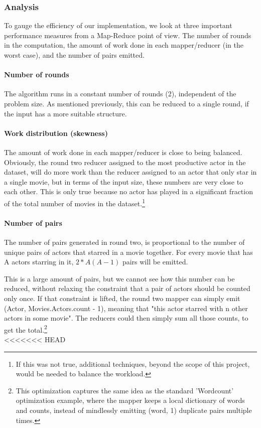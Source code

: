 \documentclass[a4paper,11pt]{article}
\begin{document}
\subsubsection{Analysis}
To gauge the efficiency of our implementation, we look at three important performance measures from a Map-Reduce point of view. The number of rounds in the computation, the amount of work done in each mapper/reducer (in the worst case), and the number of pairs emitted.

\paragraph{Number of rounds}
The algorithm runs in a constant number of rounds (2), independent of the problem size. As mentioned previously, this can be reduced to a single round, if the input has a more suitable structure.

\paragraph{Work distribution (skewness)}
The amount of work done in each mapper/reducer is close to being balanced. Obviously, the round two reducer assigned to the most productive actor in the dataset, will do more work than the reducer assigned to an actor that only star in a single movie, but in terms of the input size, these numbers are very close to each other. This is only true because no actor has played in a significant fraction of the total number of movies in the dataset.\footnote{If this was not true, additional techniques, beyond the scope of this project, would be needed to balance the workload.}

\paragraph{Number of pairs}
The number of pairs generated in round two, is proportional to the number of unique pairs of actors that starred in a movie together. For every movie that has A actors starring in it, $2*A(A-1)$ pairs will be emitted. %

This is a large amount of pairs, but we cannot see how this number can be reduced, without relaxing the constraint that a pair of actors should be counted only once. If that constraint is lifted, the round two mapper can simply emit (Actor, Movies.Actors.count - 1), meaning that "this actor starred with n other actors in some movie". The reducers could then simply sum all those counts, to get the total.\footnote{This optimization captures the same idea as the standard 'Wordcount' optimization example, where the mapper keeps a local dictionary of words and counts, instead of mindlessly emitting (word, 1) duplicate pairs multiple times.}\\
<<<<<<< HEAD
\end{document}
